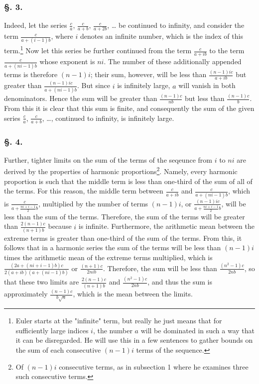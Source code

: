 \documentclass[12pt, letterpaper]{article}
\begin{document}
\subsubsection*{\S. 3.}
Indeed, let the series $\frac{c}{a}$, $\frac{c}{a+b}$, $\frac{c}{a+2b}$, \ldots
be continued to infinity, and consider the term $\frac{c}{a+(i-1)b}$,
where $i$ denotes an infinite number, which is the index of this
term.\footnote{
    Euler starts at the "infinite" term, but really he just means that for
    sufficiently large indices $i$, the number $a$ will be dominated in such
    a way that it can be disregarded. He will use this in a few sentences to
    gather bounds on the sum of each consecutive $(n-1)i$ terms of the
    sequence.
}
Now let this series be further continued from the term $\frac{c}{a+ib}$ to
the term $\frac{c}{a+(ni-1)b}$ whose exponent is $ni$.
The number of these additionally appended terms is therefore $(n-1)i$;
their sum, however, will be less than $\frac{(n-1)ic}{a+ib}$ but greater
than $\frac{(n-1)ic}{a+(ni-1)b}$.
But since $i$ is infinitely large, $a$ will vanish in both denominators.
Hence the sum will be greater than $\frac{(n-1)c}{nb}$ but less than
$\frac{(n-1)c}{b}$.
From this it is clear that this sum is finite, and consequently the sum of
the given series $\frac{c}{a}$, $\frac{c}{a+b}$, \ldots, continued to infinity,
is infinitely large.

\subsubsection*{\S. 4.}
Further, tighter limits on the sum of the terms of the seqeunce from $i$ to
$ni$ are derived by the properties of harmonic proportions\footnote{
    Of $(n-1)i$ consecutive terms, as in subsection 1 where he examines three
    such consecutive terms.
}.
Namely, every harmonic proportion is such that the middle term is less than
one-third of the sum of all of the terms.
For this reason, the middle term between $\frac{c}{a+ib}$ and
$\frac{c}{a+(ni-1)b}$, which is $\frac{c}{a+\frac{ni+i-1}{2}b}$, multiplied by
the number of terms $(n-1)i$, or $\frac{(n-1)ic}{a+\frac{ni+i-1}{2}b}$,
will be less than the sum of the terms.
Therefore, the sum of the terms will be greater than $\frac{2(n-1)c}{(n+1)b}$
because $i$ is infinite.
Furthermore, the arithmetic mean between the extreme terms is greater than
one-third of the sum of the terms.
From this, it follows that in a harmonic series the sum of the terms will be
less than $(n-1)i$ times the arithmetic mean of the extreme terms multiplied,
which is $\frac{(2a+(ni+i-1)b)c}{2(a+ib)(a+(ni-1)b)}$ or $\frac{(n+1)c}{2nib}$.
Therefore, the sum will be less than $\frac{(n^2 - 1)c}{2nb}$, so that these
two limits are $\frac{2(n-1)c}{(n+1)b}$ and $\frac{(n^2 - 1)c}{2nb}$, and
thus the sum is approximately $\frac{(n-1)c}{b\sqrt{n}}$, which is the mean
between the limits.
\end{document}

